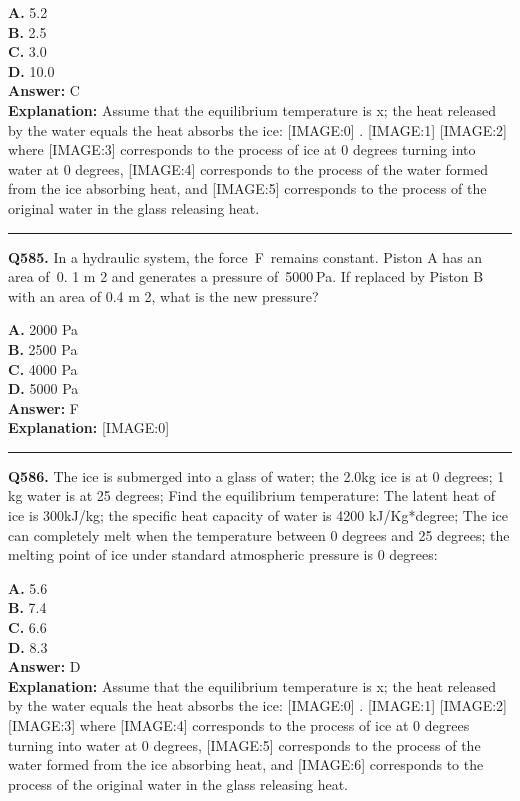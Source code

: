 \documentclass[12pt]{article}
\begin{document}
\textbf{A.} 5.2 \\
\textbf{B.} 2.5 \\
\textbf{C.} 3.0 \\
\textbf{D.} 10.0 \\

\textbf{Answer:} C \\
\textbf{Explanation:} Assume that the equilibrium temperature is x; the heat released by the water equals the heat absorbs the ice:
[IMAGE:0]
.
[IMAGE:1]
[IMAGE:2]
where
[IMAGE:3]
corresponds to the process of ice at 0 degrees turning into water at 0 degrees,
[IMAGE:4]
corresponds to the process of the water formed from the ice absorbing heat, and
[IMAGE:5]
corresponds to the process of the original water in the glass releasing heat.

\hrule
\vspace{1em}


\noindent
\textbf{Q585.} In a hydraulic system, the force F remains constant. Piston A has an area of 0.
1
m
2
and generates a pressure of 5000 Pa. If replaced by Piston B with an area of
0.4
m
2,
what is the new pressure?



\textbf{A.} 2000 Pa \\
\textbf{B.} 2500 Pa \\
\textbf{C.} 4000 Pa \\
\textbf{D.} 5000 Pa \\

\textbf{Answer:} F \\
\textbf{Explanation:} [IMAGE:0]

\hrule
\vspace{1em}


\noindent
\textbf{Q586.} The ice is submerged into a glass of water; the 2.0kg ice is at 0 degrees; 1 kg water is at 25 degrees; Find the equilibrium temperature: The latent heat of ice is 300kJ/kg; the specific heat capacity of water is 4200 kJ/Kg*degree; The ice can completely melt when the temperature between 0 degrees and 25 degrees; the melting point of ice under standard atmospheric pressure is 0 degrees:



\textbf{A.} 5.6 \\
\textbf{B.} 7.4 \\
\textbf{C.} 6.6 \\
\textbf{D.} 8.3 \\

\textbf{Answer:} D \\
\textbf{Explanation:} Assume that the equilibrium temperature is x; the heat released by the water equals the heat absorbs the ice:
[IMAGE:0]
.
[IMAGE:1]
[IMAGE:2]
[IMAGE:3]
where
[IMAGE:4]
corresponds to the process of ice at 0 degrees turning into water at 0 degrees,
[IMAGE:5]
corresponds to the process of the water formed from the ice absorbing heat, and
[IMAGE:6]
corresponds to the process of the original water in the glass releasing heat.
\end{document}
